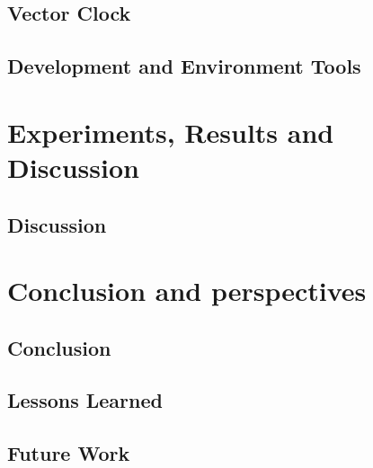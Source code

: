 \documentclass{article}
\begin{document}
  \subsection{Vector Clock}

  \subsection{Development and Environment Tools}

\section{Experiments, Results and Discussion}
  

  \subsection{Discussion}

\section{Conclusion and perspectives}
    \subsection{Conclusion}
    
    \subsection{Lessons Learned}

    \subsection{Future Work}

\newpage
    \nocite{*}
\end{document}
